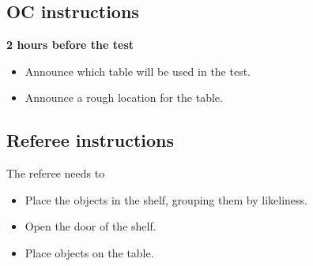 \newpage
\subsection{OC instructions}

\textbf{2 hours before the test}
\begin{itemize}
	\item Announce which table will be used in the test.
	\item Announce a rough location for the table.
\end{itemize}

\subsection{Referee instructions}
The referee needs to
\begin{itemize}
	\item Place the objects in the shelf, grouping them by likeliness.
	\item Open the door of the shelf.
	\item Place objects on the table.
\end{itemize}


% 


